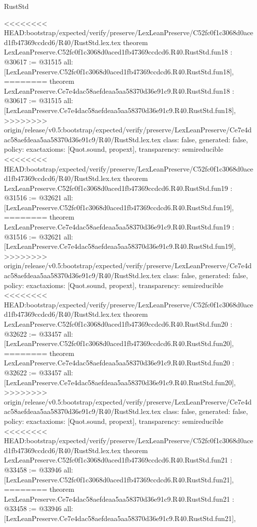 \begin{lexlean}{RustStd}
\begin{coremodule}
{\begin{coremodule}
{{{{{{{{{{{{{{{{{{{{{}
<<<<<<<< HEAD:bootstrap/expected/verify/preserve/LexLeanPreserve/C52fc0f1c3068d0aced1fb47369ccdcd6/R40/RustStd.lex.tex
theorem LexLeanPreserve.C52fc0f1c3068d0aced1fb47369ccdcd6.R40.RustStd.fun18 : @30617 := @31515 {
  all: [LexLeanPreserve.C52fc0f1c3068d0aced1fb47369ccdcd6.R40.RustStd.fun18],
========
theorem LexLeanPreserve.Ce7e4dac58aefdeaa5aa58370d36e91c9.R40.RustStd.fun18 : @30617 := @31515 {
  all: [LexLeanPreserve.Ce7e4dac58aefdeaa5aa58370d36e91c9.R40.RustStd.fun18],
>>>>>>>> origin/release/v0.5:bootstrap/expected/verify/preserve/LexLeanPreserve/Ce7e4dac58aefdeaa5aa58370d36e91c9/R40/RustStd.lex.tex
  class: false,
  generated: false,
  policy: exact{axioms: [Quot.sound, propext]},
  transparency: semireducible
}
<<<<<<<< HEAD:bootstrap/expected/verify/preserve/LexLeanPreserve/C52fc0f1c3068d0aced1fb47369ccdcd6/R40/RustStd.lex.tex
theorem LexLeanPreserve.C52fc0f1c3068d0aced1fb47369ccdcd6.R40.RustStd.fun19 : @31516 := @32621 {
  all: [LexLeanPreserve.C52fc0f1c3068d0aced1fb47369ccdcd6.R40.RustStd.fun19],
========
theorem LexLeanPreserve.Ce7e4dac58aefdeaa5aa58370d36e91c9.R40.RustStd.fun19 : @31516 := @32621 {
  all: [LexLeanPreserve.Ce7e4dac58aefdeaa5aa58370d36e91c9.R40.RustStd.fun19],
>>>>>>>> origin/release/v0.5:bootstrap/expected/verify/preserve/LexLeanPreserve/Ce7e4dac58aefdeaa5aa58370d36e91c9/R40/RustStd.lex.tex
  class: false,
  generated: false,
  policy: exact{axioms: [Quot.sound, propext]},
  transparency: semireducible
}
<<<<<<<< HEAD:bootstrap/expected/verify/preserve/LexLeanPreserve/C52fc0f1c3068d0aced1fb47369ccdcd6/R40/RustStd.lex.tex
theorem LexLeanPreserve.C52fc0f1c3068d0aced1fb47369ccdcd6.R40.RustStd.fun20 : @32622 := @33457 {
  all: [LexLeanPreserve.C52fc0f1c3068d0aced1fb47369ccdcd6.R40.RustStd.fun20],
========
theorem LexLeanPreserve.Ce7e4dac58aefdeaa5aa58370d36e91c9.R40.RustStd.fun20 : @32622 := @33457 {
  all: [LexLeanPreserve.Ce7e4dac58aefdeaa5aa58370d36e91c9.R40.RustStd.fun20],
>>>>>>>> origin/release/v0.5:bootstrap/expected/verify/preserve/LexLeanPreserve/Ce7e4dac58aefdeaa5aa58370d36e91c9/R40/RustStd.lex.tex
  class: false,
  generated: false,
  policy: exact{axioms: [Quot.sound, propext]},
  transparency: semireducible
}
<<<<<<<< HEAD:bootstrap/expected/verify/preserve/LexLeanPreserve/C52fc0f1c3068d0aced1fb47369ccdcd6/R40/RustStd.lex.tex
theorem LexLeanPreserve.C52fc0f1c3068d0aced1fb47369ccdcd6.R40.RustStd.fun21 : @33458 := @33946 {
  all: [LexLeanPreserve.C52fc0f1c3068d0aced1fb47369ccdcd6.R40.RustStd.fun21],
========
theorem LexLeanPreserve.Ce7e4dac58aefdeaa5aa58370d36e91c9.R40.RustStd.fun21 : @33458 := @33946 {
  all: [LexLeanPreserve.Ce7e4dac58aefdeaa5aa58370d36e91c9.R40.RustStd.fun21],
}}}}}}}}}}}}}}}}}}}}}}}}}
\end{coremodule}}
\end{coremodule}
\end{lexlean}
